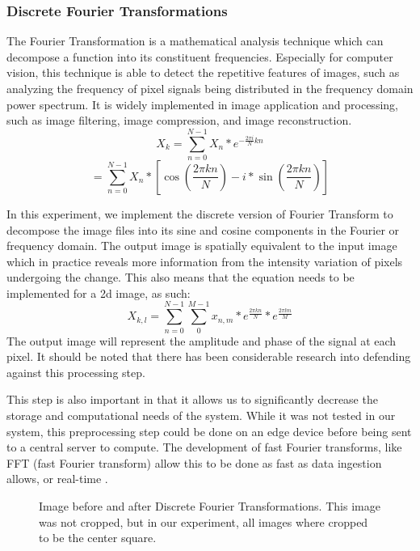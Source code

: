 \documentclass[11pt,twocolumn,letterpaper]{article}
\begin{document}
\subsubsection{Discrete Fourier Transformations}
The Fourier Transformation is a mathematical analysis technique which can decompose a function into its constituent frequencies. Especially for computer vision, this technique is able to detect the repetitive features of images, such as analyzing the frequency of pixel signals being distributed in the frequency domain power spectrum. It is widely implemented in image application and processing, such as image filtering, image compression, and image reconstruction. 
$$ X_k = \sum^{N-1}_{n=0} X_n * e^{- \frac{2 \pi i}{N} kn} $$
$$ = \sum^{N-1}_{n=0} X_n * [\cos(\frac{2\pi k n}{N}) - i * \sin(\frac{2 \pi k n}{N})] $$ \par
In this experiment, we implement the discrete version of Fourier Transform to decompose the image files into its sine and cosine components in the Fourier or frequency domain. The output image is spatially equivalent to the input image which in practice reveals more information from the intensity variation of pixels undergoing the change. This also means that the equation needs to be implemented for a 2d image, as such:
$$X_{k, l} = \sum^{N-1}_{n=0} \sum^{M-1}_0 x_{n, m} * e^{\frac{2 \pi k n}{N}} * e^{\frac{2 \pi l m}{M}} $$
The output image will represent the amplitude and phase of the signal at each pixel. It should be noted that there has been considerable research into defending against this processing step. \cite{zhang2019adversarial}\par
This step is also important in that it allows us to significantly decrease the storage and computational needs of the system. While it was not tested in our system, this preprocessing step could be done on an edge device before being sent to a central server to compute. The development of fast Fourier transforms, like FFT (fast Fourier transform) allow this to be done as fast as data ingestion allows, or real-time \cite{zeman2019discrete}.

\begin{figure}%
    \centering
    \qquad
    \caption{Image before and after Discrete Fourier Transformations. This image was not cropped, but in our experiment, all images where cropped to be the center square.}%
    \label{fig:example}%
\end{figure}
\end{document}
